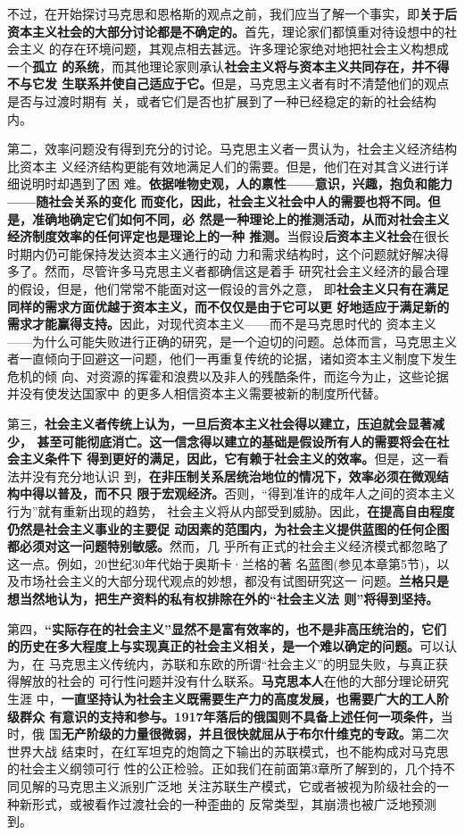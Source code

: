 不过，在开始探讨马克思和恩格斯的观点之前，我们应当了解一个事实，即\textbf{关于后
  资本主义社会的大部分讨论都是不确定的。}首先，理论家们都慎重对待设想中的社会主义
的存在环境问题，其观点相去甚远。许多理论家绝对地把社会主义构想成一个\textbf{孤立
  的系统}，而其他理论家则承认\textbf{社会主义将与资本主义共同存在，并不得不与它发
  生联系并使自己适应于它。}但是，马克思主义者有时不清楚他们的观点是否与过渡时期有
关，或者它们是否也扩展到了一种已经稳定的新的社会结构内。

第二，效率问题没有得到充分的讨论。马克思主义者一贯认为，社会主义经济结构比资本主
义经济结构更能有效地满足人们的需要。但是，他们在对其含义进行详细说明时却遇到了困
难。\textbf{依据唯物史观，人的禀性——意识，兴趣，抱负和能力——随社会关系的变化
  而变化，因此，社会主义社会中人的需要也将不同。但是，准确地确定它们如何不同，必
  然是一种理论上的推测活动，从而对社会主义经济制度效率的任何评定也是理论上的一种
  推测。}当假设\textbf{后资本主义社会}在很长时期内仍可能保持发达资本主义通行的动
力和需求结构时，这个问题就好解决得多了。然而，尽管许多马克思主义者都确信这是着手
研究社会主义经济的最合理的假设，但是，他们常常不能面对这一假设的言外之意，
即\textbf{社会主义只有在满足同样的需求方面优越于资本主义，而不仅仅是由于它可以更
  好地适应于满足新的需求才能赢得支持。}因此，对现代资本主义——而不是马克思时代的
资本主义——为什么可能失败进行正确的研究，是一个迫切的问题。总体而言，马克思主义
者一直倾向于回避这一问题，他们一再重复传统的论据，诸如资本主义制度下发生危机的倾
向、对资源的挥霍和浪费以及非人的残酷条件，而迄今为止，这些论据并没有使发达国家中
的更多人相信资本主义需要被新的制度所代替。

第三，\textbf{社会主义者传统上认为，一旦后资本主义社会得以建立，压迫就会显著减少，
  甚至可能彻底消亡。这一信念得以建立的基础是假设所有人的需要将会在社会主义条件下
  得到更好的满足，因此，它有赖于社会主义的效率。}但是，这一看法并没有充分地认识
到，\textbf{在非压制关系居统治地位的情况下，效率必须在微观结构中得以普及，而不只
  限于宏观经济。}否则，“得到准许的成年人之间的资本主义行为”就有重新出现的趋势，
社会主义将从内部受到威胁。因此，\textbf{在提高自由程度仍然是社会主义事业的主要促
  动因素的范围内，为社会主义提供蓝图的任何企图都必须对这一问题特别敏感。}然而，几
乎所有正式的社会主义经济模式都忽略了这一点。例如，20世纪30年代始于奥斯卡·兰格的著
名蓝图(参见本章第5节)，以及市场社会主义的大部分现代观点的妙想，都没有试图研究这一
问题。\textbf{兰格只是想当然地认为，把生产资料的私有权排除在外的“社会主义法
  则”将得到坚持。}

第四，\textbf{“实际存在的社会主义”显然不是富有效率的，也不是非高压统治的，它们
  的历史在多大程度上与实现真正的社会主义相关，是一个难以确定的问题。}可以认为，在
马克思主义传统内，苏联和东欧的所谓“社会主义”的明显失败，与真正获得解放的社会的
可行性问题并没有什么联系。\textbf{马克思本人}在他的大部分理论研究生涯
中，\textbf{一直坚持认为社会主义既需要生产力的高度发展，也需要广大的工人阶级群众
  有意识的支持和参与。1917年落后的俄国则不具备上述任何一项条件，}当时，俄
国\textbf{无产阶级的力量很微弱，并且很快就屈从于布尔什维克的专政。}第二次世界大战
结束时，在红军坦克的炮筒之下输出的苏联模式，也不能构成对马克思的社会主义纲领可行
性的公正检验。正如我们在前面第3章所了解到的，几个持不同见解的马克思主义派别广泛地
关注苏联生产模式，它或者被视为阶级社会的一种新形式，或被看作过渡社会的一种歪曲的
反常类型，其崩溃也被广泛地预测到。

